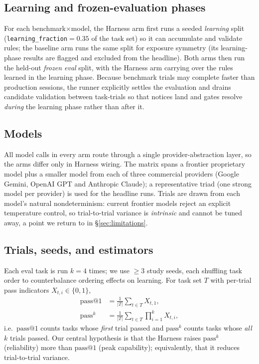 \documentclass[letterpaper]{article} %
\makeatletter
\newcommand{\passk}{\mathrm{pass}^{k}}
\newcommand{\passone}{\mathrm{pass@}1}
\makeatother
\begin{document}
\subsection{Learning and frozen-evaluation phases}
For each benchmark$\times$model, the Harness arm first runs a seeded \emph{learning} split
(\texttt{learning\_fraction}$=0.35$ of the task set) so it can accumulate and validate rules;
the baseline arm runs the same split for exposure symmetry (its learning-phase results are
flagged and excluded from the headline). Both arms then run the held-out \emph{frozen eval}
split, with the Harness arm carrying over the rules learned in the learning phase. Because
benchmark trials may complete faster than production sessions, the runner explicitly settles
the evaluation and drains candidate validation between task-trials so that notices land and
gates resolve \emph{during} the learning phase rather than after it.

\subsection{Models}
All model calls in every arm route through a single provider-abstraction layer, so the arms
differ only in Harness wiring. The matrix spans a frontier proprietary model plus a smaller
model from each of three commercial providers (Google Gemini, OpenAI GPT
and Anthropic Claude); a representative triad (one strong model per provider) is used for the 
headline runs. Trials are drawn from each model's natural nondeterminism: current frontier 
models reject an explicit temperature control, so trial-to-trial variance is \emph{intrinsic} 
and cannot be tuned away, a point we return to in \S\ref{sec:limitations}.

\subsection{Trials, seeds, and estimators}
Each eval task is run $k=4$ times; we use $\ge 3$ study seeds, each shuffling task order to
counterbalance ordering effects on learning. For task set $T$ with per-trial pass indicators
$X_{t,i}\in\{0,1\}$,
\begin{align}
  \passone &= \frac{1}{|T|}\sum_{t\in T} X_{t,1}, \label{eq:pass1}\\
  \passk   &= \frac{1}{|T|}\sum_{t\in T} \prod_{i=1}^{k} X_{t,i}, \label{eq:passk}
\end{align}
i.e.\ $\passone$ counts tasks whose \emph{first} trial passed and $\passk$ counts tasks whose
\emph{all} $k$ trials passed. Our central hypothesis is that the Harness raises $\passk$
(reliability) more than $\passone$ (peak capability); equivalently, that it reduces
trial-to-trial variance.
\end{document}
